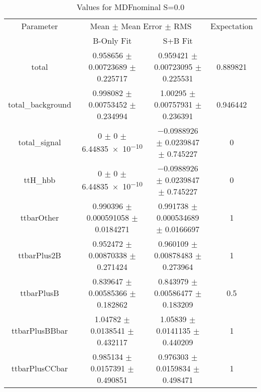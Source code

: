 \begin{table}
\centering
\caption{Values for MDFnominal S=0.0}
\begin{tabular}{cccc}
\toprule
Parameter & \multicolumn{2}{c}{Mean $\pm$ Mean Error $\pm$ RMS} & Expectation\\
 & B-Only Fit & S+B Fit & \\
\midrule
total & \num{0.958656} $\pm$ \num{0.00723689} $\pm$ \num{0.225717} & \num{0.959421} $\pm$ \num{0.00723095} $\pm$ \num{0.225531} & \num{0.889821}\\
total\_background & \num{0.998082} $\pm$ \num{0.00753452} $\pm$ \num{0.234994} & \num{1.00295} $\pm$ \num{0.00757931} $\pm$ \num{0.236391} & \num{0.946442}\\
total\_signal & \num{0} $\pm$ \num{0} $\pm$ \num{6.44835e-10} & \num{-0.0988926} $\pm$ \num{0.0239847} $\pm$ \num{0.745227} & \num{0}\\
ttH\_hbb & \num{0} $\pm$ \num{0} $\pm$ \num{6.44835e-10} & \num{-0.0988926} $\pm$ \num{0.0239847} $\pm$ \num{0.745227} & \num{0}\\
ttbarOther & \num{0.990396} $\pm$ \num{0.000591058} $\pm$ \num{0.0184271} & \num{0.991738} $\pm$ \num{0.000534689} $\pm$ \num{0.0166697} & \num{1}\\
ttbarPlus2B & \num{0.952472} $\pm$ \num{0.00870338} $\pm$ \num{0.271424} & \num{0.960109} $\pm$ \num{0.00878483} $\pm$ \num{0.273964} & \num{1}\\
ttbarPlusB & \num{0.839647} $\pm$ \num{0.00585366} $\pm$ \num{0.182862} & \num{0.843979} $\pm$ \num{0.00586477} $\pm$ \num{0.183209} & \num{0.5}\\
ttbarPlusBBbar & \num{1.04782} $\pm$ \num{0.0138541} $\pm$ \num{0.432117} & \num{1.05839} $\pm$ \num{0.0141135} $\pm$ \num{0.440209} & \num{1}\\
ttbarPlusCCbar & \num{0.985134} $\pm$ \num{0.0157391} $\pm$ \num{0.490851} & \num{0.976303} $\pm$ \num{0.0159834} $\pm$ \num{0.498471} & \num{1}\\
\bottomrule
\end{tabular}
\end{table}